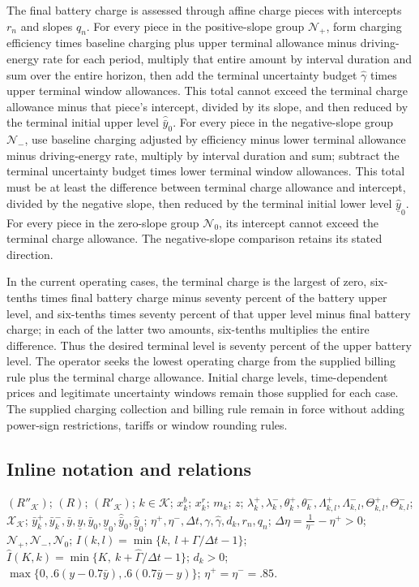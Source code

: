 \documentclass[10pt]{article}
\begin{document}
The final battery charge is assessed through affine charge pieces with intercepts $r_n$ and slopes $q_n$. For every piece in the positive-slope group $\mathcal N_+$, form charging efficiency times baseline charging plus upper terminal allowance minus driving-energy rate for each period, multiply that entire amount by interval duration and sum over the entire horizon, then add the terminal uncertainty budget $\hat\gamma$ times upper terminal window allowances. This total cannot exceed the terminal charge allowance minus that piece's intercept, divided by its slope, and then reduced by the terminal initial upper level $\hat{\bar y}_0$. For every piece in the negative-slope group $\mathcal N_-$, use baseline charging adjusted by efficiency minus lower terminal allowance minus driving-energy rate, multiply by interval duration and sum; subtract the terminal uncertainty budget times lower terminal window allowances. This total must be at least the difference between terminal charge allowance and intercept, divided by the negative slope, then reduced by the terminal initial lower level $\hat{\underline y}_0$. For every piece in the zero-slope group $\mathcal N_0$, its intercept cannot exceed the terminal charge allowance. The negative-slope comparison retains its stated direction.

In the current operating cases, the terminal charge is the largest of zero, six-tenths times final battery charge minus seventy percent of the battery upper level, and six-tenths times seventy percent of that upper level minus final battery charge; in each of the latter two amounts, six-tenths multiplies the entire difference. Thus the desired terminal level is seventy percent of the upper battery level. The operator seeks the lowest operating charge from the supplied billing rule plus the terminal charge allowance. Initial charge levels, time-dependent prices and legitimate uncertainty windows remain those supplied for each case. The supplied charging collection and billing rule remain in force without adding power-sign restrictions, tariffs or window rounding rules.

\subsection*{Inline notation and relations}
$(R''_{\mathcal K})$; $(R)$; $(R'_{\mathcal K})$; $k \in \mathcal{K}$; $x_k^b$; $x_k^r$; $m_k$; $z$; $\lambda_k^+,\lambda_k^-,\theta_k^+,\theta_k^-,\Lambda_{k,l}^+,\Lambda_{k,l}^-,
\Theta_{k,l}^+,\Theta_{k,l}^-$; $\mathcal{X}_{\mathcal K}$; $\bar y_k^+,\bar y_k^-,\bar y,\underline y,\bar y_0,\underline y_0,
\hat{\bar y}_0,\hat{\underline y}_0$; $\eta^+,\eta^-,\Delta t,\gamma,\hat{\gamma},d_k,r_n,q_n$; $\Delta\eta = \frac{1}{\eta^-} - \eta^+ > 0$; $\mathcal{N}_+,\mathcal{N}_-,\mathcal{N}_0$; $I(k,l)=\min\{k,\ l+\Gamma/\Delta t-1\}$; $\hat I(K,k)=\min\{K,\ k+\hat{\Gamma}/\Delta t-1\}$; $d_k>0$; $\max\{0,.6(y-0.7\bar y),.6(0.7\bar y-y)\}$; $\eta^+=\eta^-=.85$.
\end{document}
